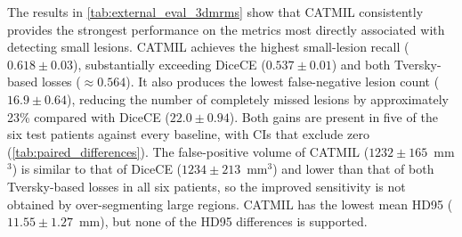 \begin{table}[t]
\centering
\caption{Comparison of CATMIL with standard losses and the instance-level
loss CC-DiceCE on the 3D-MR-MS test set. Best values are shown in
\textbf{bold}; second-best values are \underline{underlined}.}
\label{tab:external_eval_3dmrms}
\end{table}

The results in \cref{tab:external_eval_3dmrms} show that CATMIL
consistently provides the strongest performance on the metrics most
directly associated with detecting small lesions. CATMIL achieves the
highest small-lesion recall ($0.618 \pm 0.03$), substantially exceeding
DiceCE ($0.537 \pm 0.01$) and both Tversky-based losses ($\approx0.564$).
It also produces the lowest false-negative lesion count
($16.9 \pm 0.64$), reducing the number of completely missed lesions by
approximately 23\% compared with DiceCE ($22.0 \pm 0.94$). Both gains are
present in five of the six test patients against every baseline, with CIs
that exclude zero (\cref{tab:paired_differences}). The false-positive
volume of CATMIL ($1232 \pm 165$~mm$^3$) is similar to that of DiceCE
($1234 \pm 213$~mm$^3$) and lower than that of both Tversky-based losses in
all six patients, so the improved sensitivity is not obtained by
over-segmenting large regions. CATMIL has the lowest mean HD95
($11.55 \pm 1.27$~mm), but none of the HD95 differences is supported.

